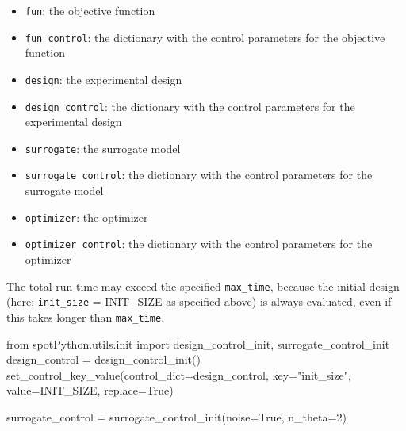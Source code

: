\documentclass[
  letterpaper,
  DIV=11,
  numbers=noendperiod]{scrreprt}
\newenvironment{Shaded}{\begin{snugshade}}{\end{snugshade}}
\newcommand{\DecValTok}[1]{\textcolor[rgb]{0.68,0.00,0.00}{#1}}
\newcommand{\ImportTok}[1]{\textcolor[rgb]{0.00,0.46,0.62}{#1}}
\newcommand{\NormalTok}[1]{\textcolor[rgb]{0.00,0.23,0.31}{#1}}
\newcommand{\OperatorTok}[1]{\textcolor[rgb]{0.37,0.37,0.37}{#1}}
\newcommand{\StringTok}[1]{\textcolor[rgb]{0.13,0.47,0.30}{#1}}
\newcommand{\VariableTok}[1]{\textcolor[rgb]{0.07,0.07,0.07}{#1}}
\providecommand{\tightlist}{%
  \setlength{\itemsep}{0pt}\setlength{\parskip}{0pt}}\usepackage{longtable,booktabs,array}
\begin{document}
\begin{itemize}
\tightlist
\item
  \texttt{fun}: the objective function
\item
  \texttt{fun\_control}: the dictionary with the control parameters for
  the objective function
\item
  \texttt{design}: the experimental design
\item
  \texttt{design\_control}: the dictionary with the control parameters
  for the experimental design
\item
  \texttt{surrogate}: the surrogate model
\item
  \texttt{surrogate\_control}: the dictionary with the control
  parameters for the surrogate model
\item
  \texttt{optimizer}: the optimizer
\item
  \texttt{optimizer\_control}: the dictionary with the control
  parameters for the optimizer
\end{itemize}

\begin{tcolorbox}[enhanced jigsaw, coltitle=black, bottomrule=.15mm, breakable, toprule=.15mm, colframe=quarto-callout-note-color-frame, title=\textcolor{quarto-callout-note-color}{\faInfo}\hspace{0.5em}{Note: Total run time}, colbacktitle=quarto-callout-note-color!10!white, opacityback=0, left=2mm, leftrule=.75mm, colback=white, rightrule=.15mm, bottomtitle=1mm, toptitle=1mm, titlerule=0mm, arc=.35mm, opacitybacktitle=0.6]

The total run time may exceed the specified \texttt{max\_time}, because
the initial design (here: \texttt{init\_size} = INIT\_SIZE as specified
above) is always evaluated, even if this takes longer than
\texttt{max\_time}.

\end{tcolorbox}

\begin{Shaded}
\begin{Highlighting}[]
\ImportTok{from}\NormalTok{ spotPython.utils.init }\ImportTok{import}\NormalTok{ design\_control\_init, surrogate\_control\_init}
\NormalTok{design\_control }\OperatorTok{=}\NormalTok{ design\_control\_init()}
\NormalTok{set\_control\_key\_value(control\_dict}\OperatorTok{=}\NormalTok{design\_control,}
\NormalTok{                        key}\OperatorTok{=}\StringTok{"init\_size"}\NormalTok{,}
\NormalTok{                        value}\OperatorTok{=}\NormalTok{INIT\_SIZE,}
\NormalTok{                        replace}\OperatorTok{=}\VariableTok{True}\NormalTok{)}

\NormalTok{surrogate\_control }\OperatorTok{=}\NormalTok{ surrogate\_control\_init(noise}\OperatorTok{=}\VariableTok{True}\NormalTok{,}
\NormalTok{                                           n\_theta}\OperatorTok{=}\DecValTok{2}\NormalTok{)}
\end{Highlighting}
\end{Shaded}
\end{document}
